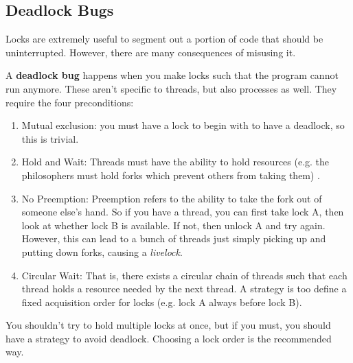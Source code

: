\documentclass{article}
\begin{document}
  \subsection{Deadlock Bugs}

    Locks are extremely useful to segment out a portion of code that should be uninterrupted. However, there are many consequences of misusing it. 

    \begin{definition}
      A \textbf{deadlock bug} happens when you make locks such that the program cannot run anymore. These aren't specific to threads, but also processes as well. They require the four preconditions: 
      \begin{enumerate}
        \item Mutual exclusion: you must have a lock to begin with to have a deadlock, so this is trivial. 
        \item Hold and Wait: Threads must have the ability to hold resources (e.g. the philosophers must hold forks which prevent others from taking them) . 
        \item No Preemption: Preemption refers to the ability to take the fork out of someone else's hand. So if you have a thread, you can first take lock A, then look at whether lock B is available. If not, then unlock A and try again. However, this can lead to a bunch of threads just simply picking up and putting down forks, causing a \textit{livelock}. 
        \item Circular Wait: That is, there exists a circular chain of threads such that each thread holds a resource needed by the next thread. A strategy is too define a fixed acquisition order for locks (e.g. lock A always before lock B). 
      \end{enumerate}
      You shouldn't try to hold multiple locks at once, but if you must, you should have a strategy to avoid deadlock. Choosing a lock order is the recommended way. 
    \end{definition}
\end{document}
